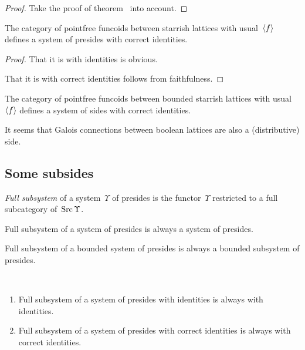 \begin{proof}
Take the proof of theorem~ into account.
\end{proof}

\begin{prop}
The category of pointfree funcoids between starrish lattices with usual~$\left\langle f\right\rangle$ defines a system of presides with correct identities.
\end{prop}

\begin{proof}
That it is with identities is obvious.

That it is with correct identities follows from faithfulness.
\end{proof}

\begin{obvious}
The category of pointfree funcoids between bounded starrish lattices with usual~$\left\langle f\right\rangle$ defines a system of sides with correct identities.
\end{obvious}

It seems  that Galois connections between boolean lattices 
are also a (distributive) side.



\subsection{Some subsides}

\begin{defn}
\emph{Full subsystem} of a system~$\Upsilon$ of presides is the functor~$\Upsilon$ restricted to a full subcategory of~$\operatorname{Src}\Upsilon$.
\end{defn}

\begin{obvious}
Full subsystem of a system of presides is always a system of presides.
\end{obvious}

\begin{obvious}
Full subsystem of a bounded system of presides is always a bounded subsystem of presides.
\end{obvious}

\begin{obvious}
~
\begin{enumerate}
\item Full subsystem of a system of presides with identities is always with identities.
\item Full subsystem of a system of presides with correct identities is always with correct identities.
\end{enumerate}
\end{obvious}

